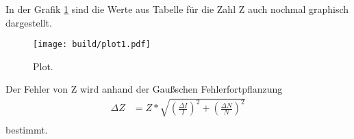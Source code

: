   In der Grafik \ref{fig:plot1} sind die Werte aus Tabelle für die Zahl
  Z auch nochmal graphisch dargestellt.
  \begin{figure}
    \centering
    \texttt{[image: build/plot1.pdf]}
    \caption{Plot.}
    \label{fig:plot1}
  \end{figure}

  Der Fehler von Z wird anhand der Gaußschen Fehlerfortpflanzung 
  \begin{align*}
    \Delta Z & = Z * \sqrt{\left( \frac{\Delta I}{I} \right)^2 + \left( \frac{\Delta N}{N} \right)^2}\\
  \end{align*}
  bestimmt.
